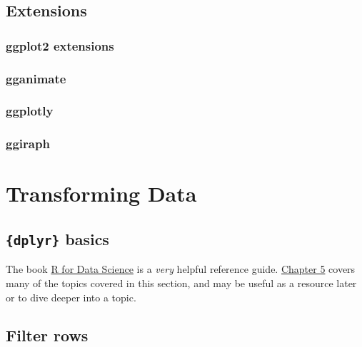 \documentclass[
]{book}
\begin{document}
\hypertarget{extensions-1}{%
\section{Extensions}\label{extensions-1}}

\hypertarget{ggplot2-extensions}{%
\subsection*{ggplot2 extensions}\label{ggplot2-extensions}}

\hypertarget{gganimate}{%
\subsection*{gganimate}\label{gganimate}}

\hypertarget{ggplotly}{%
\subsection*{ggplotly}\label{ggplotly}}

\hypertarget{ggiraph}{%
\subsection*{ggiraph}\label{ggiraph}}

\hypertarget{transforming-data}{%
\chapter{Transforming Data}\label{transforming-data}}

\hypertarget{dplyr-basics}{%
\section*{\texorpdfstring{\texttt{\{dplyr\}} basics}{\{dplyr\} basics}}\label{dplyr-basics}}

The book \href{https://r4ds.had.co.nz/}{R for Data Science} is a \emph{very} helpful reference guide. \href{https://r4ds.had.co.nz/transform.html}{Chapter 5} covers many of the topics covered in this section, and may be useful as a resource later or to dive deeper into a topic.

\hypertarget{filter-rows}{%
\section{Filter rows}\label{filter-rows}}
\end{document}
